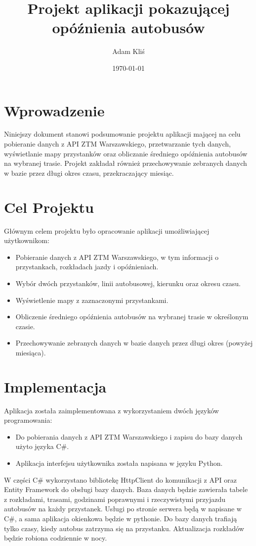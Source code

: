 \documentclass{article}
\title{Projekt aplikacji pokazującej opóźnienia autobusów}
\author{Adam Kliś}
\date{\today}
\begin{document}
\maketitle

\section{Wprowadzenie}
Niniejszy dokument stanowi podsumowanie projektu aplikacji mającej na celu pobieranie danych z API ZTM Warszawskiego, przetwarzanie tych danych, wyświetlanie mapy przystanków oraz obliczanie średniego opóźnienia autobusów na wybranej trasie. Projekt zakładał również przechowywanie zebranych danych w bazie przez długi okres czasu, przekraczający miesiąc.

\section{Cel Projektu}
Głównym celem projektu było opracowanie aplikacji umożliwiającej użytkownikom:
\begin{itemize}
    \item Pobieranie danych z API ZTM Warszawskiego, w tym informacji o przystankach, rozkładach jazdy i opóźnieniach.
    \item Wybór dwóch przystanków, linii autobusowej, kierunku oraz okresu czasu.
    \item Wyświetlenie mapy z zaznaczonymi przystankami.
    \item Obliczenie średniego opóźnienia autobusów na wybranej trasie w określonym czasie.
    \item Przechowywanie zebranych danych w bazie danych przez długi okres (powyżej miesiąca).
\end{itemize}

\section{Implementacja}
Aplikacja została zaimplementowana z wykorzystaniem dwóch języków programowania:
\begin{itemize}
    \item Do pobierania danych z API ZTM Warszawskiego i zapisu do bazy danych użyto języka C#.
    \item Aplikacja interfejsu użytkownika została napisana w języku Python.
\end{itemize}
W części C# wykorzystano bibliotekę HttpClient do komunikacji z API oraz Entity Framework do obsługi bazy danych.
Baza danych będzie zawierała tabele z rozkładami, trasami, godzinami poprawnymi i rzeczywistymi przyjazdu autobusów na każdy przystanek. 
Usługi po stronie serwera będą w napisane w C#, a sama aplikacja okienkowa będzie w pythonie.
Do bazy danych trafiają tylko czasy, kiedy autobus zatrzyma się na przystanku.
Aktualizacja rozkładów będzie robiona codziennie w nocy. 
\end{document}
